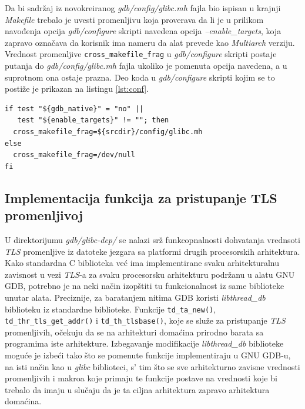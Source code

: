 \documentclass[12pt,oneside]{memoir}
\begin{document}
Da bi sadržaj iz novokreiranog \emph{gdb/config/glibc.mh} fajla bio ispisan u krajnji \emph{Makefile} trebalo je uvesti promenljivu koja proverava da li je u prilikom navođenja opcija \emph{gdb/configure} skripti navedena opcija \emph{--enable\_targets}, koja zapravo označava da korisnik ima nameru da alat prevede kao \emph{Multiarch} verziju. Vrednost promenljive \texttt{cross\_makefile\_frag} u \emph{gdb/configure} skripti postaje putanja do \emph{gdb/config/glibc.mh} fajla ukoliko je pomenuta opcija navedena, a u suprotnom ona ostaje prazna.\newpage
Deo koda u \emph{gdb/configure} skripti kojim se to postiže je prikazan na listingu \ref{lst:conf}.
\begin{lstlisting}[label={lst:conf}, caption={Izmena \emph{gdb/configure} fajla.}]
if test "${gdb_native}" = "no" ||
   test "${enable_targets}" != ""; then
  cross_makefile_frag=${srcdir}/config/glibc.mh
else
  cross_makefile_frag=/dev/null
fi
\end{lstlisting}

\subsection{Implementacija funkcija za pristupanje TLS promenljivoj}

U direktorijumu \emph{gdb/glibc-dep/} se nalazi srž funkcopnalnosti dohvatanja vrednsoti \emph{TLS} promenljive iz datoteke jezgara sa platformi drugih procesorskih arhitektura. Kako standardna C biblioteka već ima implementirane svaku arhitekturalnu zavisnost u vezi \emph{TLS}-a za svaku procesorsku arhitekturu podržanu u alatu GNU GDB, potrebno je na neki način izopštiti tu funkcionalnost iz same biblioteke unutar alata. Preciznije, za baratanjem nitima GDB koristi \emph{libthread\_db} biblioteku iz standardne biblioteke. Funkcije \texttt{td\_ta\_new()}, \texttt{td\_thr\_tls\_get\_addr()} i \texttt{td\_th\_tlsbase()}, koje se služe za pristupanje \emph{TLS} promenljivih, očekuju da se na arhitekturi domaćina prirodno barata sa programima iste arhitekture. Izbegavanje modifikacije \emph{libthread\_db} biblioteke moguće je izbeći tako što se pomenute funkcije implementiraju u GNU GDB-u, na isti način kao u \emph{glibc} biblioteci, s’ tim što se sve arhitekturno zavisne vrednosti promenljivih i makroa koje primaju te funkcije postave na vrednosti koje bi trebalo da imaju u slučaju da je ta ciljna arhitektura zapravo arhitektura domaćina.
\end{document}

